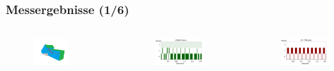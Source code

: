 \documentclass{beamer}
\begin{document}
\begin{frame}
	\frametitle{Messergebnisse (1/6)}
	\begin{columns}
		\begin{figure}
			\includegraphics[width=0.68\textwidth]{img/type1.png} \pause
		\end{figure}
		\begin{figure}
			\includegraphics[width=0.9\textwidth]{img/hum12.png}
		\end{figure}
		\begin{figure}
			\includegraphics[width=0.9\textwidth]{img/ki1.png} 

\end{figure}
\end{columns}
\end{frame}
\end{document}
